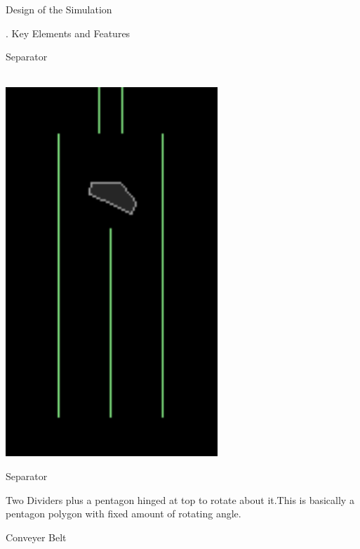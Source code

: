 \documentclass[a4paper,11pt]{resume}
\begin{document}
\begin{rSection}{{\heading Design of the Simulation}}
\begin{rSubsection}{{. Key Elements and Features}}{}{}{}
\begin{rSubsection}{{ Separator}}{}{}{}
\\ \\
\begin{minipage}{0.15\textwidth}
\centering
\includegraphics[width=0.6\textwidth,scale=0.4]{separator.png}
\label{fig:find}
\caption{Separator}
\end{minipage}
\begin{minipage}{0.80\textwidth}
Two Dividers plus a pentagon hinged at top to rotate about it.This is basically a pentagon polygon with fixed amount of rotating angle.
\end{minipage}

\end{rSubsection}
\begin{rSubsection}{{ Conveyer Belt}}{}{}{}


\end{rSubsection}
\end{rSubsection}
\end{rSection}
\end{document}
